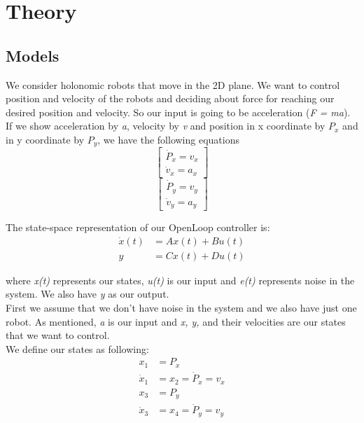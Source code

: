 \section{Theory}
\label{sec:theory}


\subsection{Models}
We consider holonomic robots that move in the 2D plane.
We want to control position and velocity of the robots and deciding about force for reaching our desired position and velocity. So our input is going to be acceleration (\emph{F = ma}). If we show acceleration by \emph{a}, velocity by \emph{v} and position in x coordinate by \emph{$P_x$} and in y coordinate by \emph{$P_y$}, we have the following equations
\begin{equation}
\begin{bmatrix}
\dot{P}_x = v_x \\
\dot{v}_x = a_x
\end{bmatrix}
\end{equation}
\begin{equation}
\begin{bmatrix}
\dot{P}_y = v_y \\
\dot{v}_y = a_y
\end{bmatrix}
\end{equation}


The state-space representation of our OpenLoop controller is: 
\begin{align}
\dot{x}(t)  &=  A x(t) + B u(t) \\
y &= C x(t) + D u(t)\nonumber
\end{align}


where \emph{x(t)} represents our states, \emph{u(t)} is our input and \emph{e(t)} represents noise in the system. We also have \emph{y} as our output.\\
First we assume that we don't have noise in the system and we also have just one robot. As mentioned, \emph{a} is our input and \emph{x, y,} and their velocities are our states that we want to control.\\
We define our states as following:
\begin{align}
x_1 &= P_x \\ \nonumber
\dot{x}_1 &= x_2 = \dot{P}_x = v_x\\\nonumber
x_3 &= P_y\\ \nonumber
 \dot{x}_3 &= x_4 = \dot{P}_y = v_y \nonumber
\end{align}


